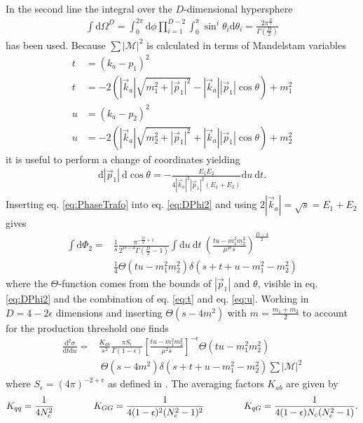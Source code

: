 In the second line the integral over the $D$-dimensional hypersphere 
\begin{align}
\int \mathrm{d}\Omega^D = \int_0^{2\pi} \mathrm{d}\phi \prod_{i=1}^{D-2}\int_0^\pi \sin^i\theta_i \mathrm{d}\theta_i = \frac{2\pi^{\frac{D}{2}}}{\Gamma(\frac{D}{2})}
\end{align}
has been used. Because $\sum|\mathcal{M}|^2$ is calculated in terms of Mandelstam variables 
\begin{align}
t &= (k_a-p_1)^2  \nonumber\\
t &= -2\left(|\vec{k}_a| \sqrt{m_1^2 + |\vec{p}_1|^2} - |\vec{k}_a||\vec{p}_1| \cos\theta\right) + m_1^2\label{eq:t} \\
u &= (k_a-p_2)^2\nonumber\\
u &= -2\left(|\vec{k}_a| \sqrt{m_2^2 + |\vec{p}_1|^2} + |\vec{k}_a||\vec{p}_1| \cos\theta\right) + m_2^2\label{eq:u}
\end{align}
it is useful to perform a change of coordinates yielding
\begin{align}
\mathrm{d}|\vec{p}_1|\ \mathrm{d}\cos\theta = -\frac{E_1 E_2}{4|\vec{k}_a|^2|\vec{p}_1|^2(E_1+E_2)}\mathrm{d}u\ \mathrm{d}t.\label{eq:PhaseTrafo}
\end{align}
Inserting eq. \eqref{eq:PhaseTrafo} into eq. \eqref{eq:DPhi2} and using $2|\vec{k}_a| = \sqrt{s} = E_1 + E_2$ gives
\begin{align}
\int \mathrm{d}\Phi_2 = & \frac{1}{s} \frac{\pi^{-\frac{D}{2}+1}}{2^{D-3}\Gamma(\frac{D}{2}-1)} \int \mathrm{d}u\ \mathrm{d}t\ \left( \frac{tu-m_1^2m_2^2}{\mu^{2\epsilon} s} \right)^{\frac{D-4}{2}} \nonumber\\
&\frac{1}{4}\Theta(tu-m_1^2m_2^2)\delta \left(s+t+u-m_1^2-m_2^2\right)
\end{align}
where the $\Theta$-function comes from the bounds of $|\vec{p}_1|$ and $\theta$, visible in eq. \eqref{eq:DPhi2} and the combination of eq. \eqref{eq:t} and eq. \eqref{eq:u}. Working in $D=4-2\epsilon$ dimensions and inserting $\Theta(s-4m^2)$ with $m = \frac{m_1 + m_2}{2}$ to account for the production threshold one finds
\begin{align}
\frac{\mbox{d}^2 \sigma}{\mbox{d}t\mbox{d}u} =& \frac{K_{ab}}{s^2} \frac{\pi S_{\epsilon}}{\Gamma(1-\epsilon)} \left[ \frac{tu-m_1^2m_2^2}{\mu^2 s}\right]^{-\epsilon} \Theta(tu-m_1^2m_2^2)\nonumber\\
&\ \Theta(s-4m^2) \delta(s+t+u-m_1^2-m_2^2) \sum |\mathcal{M}|^2
\end{align}
where $S_\epsilon = (4\pi)^{-2+\epsilon}$ as defined in \cite{Beenakker:1996ch}.
The averaging factors $K_{ab}$ are given by
\begin{align}
K_{qq} = \frac{1}{4N_c^2} \hspace{1.5cm}K_{GG} = \frac{1}{4(1-\epsilon)^2(N_c^2-1)^2} \hspace{1.5cm}K_{qG} = \frac{1}{4(1-\epsilon)N_c(N_c^2-1)}.
\end{align}

